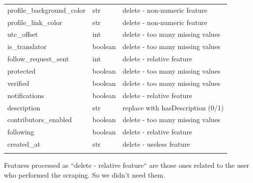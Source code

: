 \begin{center}
\begin{tabular}{lll}
		profile\_background\_color&str&delete - non-numeric feature\\
		profile\_link\_color&str&delete - non-numeric feature\\
		utc\_offset&int&delete - too many missing values\\
		is\_translator&boolean&delete - too many missing values\\
		follow\_request\_sent&int&delete - relative feature\\
		protected&boolean&delete - too many missing values\\
		verified&boolean&delete - too many missing values\\
		notifications&boolean&delete - relative feature\\
		description&str&replace with hasDescription (0/1)\\
		contributors\_enabled&boolean&delete - too many missing values\\
		following&boolean&delete - relative feature\\
		created\_at&str&delete - useless feature\\\hline\\
	\end{tabular}
\end{center}
\normalsize
Features processed as ``delete - relative feature`` are those ones related to the user who performed the scraping. So we didn't need them.

